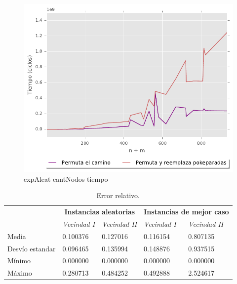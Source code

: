 \begin{figure}[H]
  \begin{center}
    \includegraphics{../experimentacion/ej3/expAleat_cantNodos_tiempo.pdf}
    \caption{expAleat cantNodos tiempo}
    \label{fig:expAleat_cantNodos_tiempo}
  \end{center}
\end{figure}

\begin{table}[H]
    \begin{center}
        \begin{tabular}{ | l | l | l | l | l | }
            \hline
            \multicolumn{1}{|c|}{}&
            \multicolumn{2}{|c|}{\textbf{Instancias aleatorias}}&
            \multicolumn{2}{|c|}{\textbf{Instancias de mejor caso}}\\
            \cline{2-5}
                        &    \textit{Vecindad I}     &    \textit{Vecindad II}    &    \textit{Vecindad I}     &    \textit{Vecindad II}    \\ \hline
            Media       &   0.100376    &   0.127016    &   0.116154    &   0.807135    \\ \hline
            Desv\'io estandar       &   0.096465    &   0.135994    &   0.148876    &   0.937515    \\ \hline
            M\'inimo    &   0.000000    &   0.000000    &   0.000000    &   0.000000    \\ \hline
            M\'aximo    &   0.280713    &   0.484252    &   0.492888    &   2.524617    \\ \hline
        \end{tabular}
    \end{center}
    \caption{Error relativo.}    
    \label{table:error_relativo}
\end{table} 
